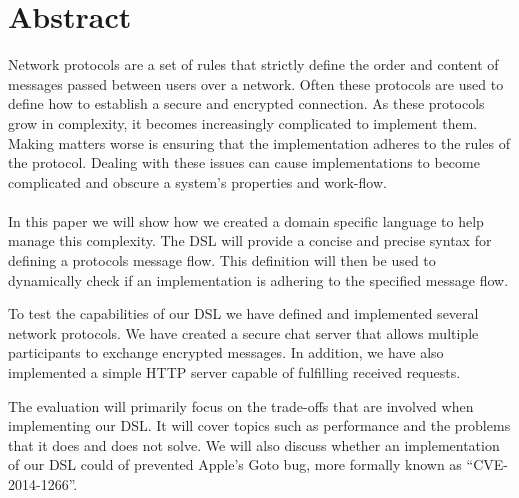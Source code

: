 \section*{Abstract}
Network protocols are a set of rules that strictly define the order and content of messages passed between users over a network. Often these protocols are used to define how to establish a secure and encrypted connection. As these protocols grow in complexity, it becomes increasingly complicated to implement them. Making matters worse is ensuring that the implementation adheres to the rules of the protocol. Dealing with these issues can cause implementations to become complicated and obscure a system's properties and work-flow.
\\\\
In this paper we will show how we created a domain specific language to help manage this complexity. The DSL will provide a concise and precise syntax for defining a protocols message flow. This definition will then be used to dynamically check if an implementation is adhering to the specified message flow. 

To test the capabilities of our DSL we have defined and implemented several network protocols. We have created a secure chat server that allows multiple participants to exchange encrypted messages. In addition, we have also implemented a simple HTTP server capable of fulfilling received requests.

The evaluation will primarily focus on the trade-offs that are involved when implementing our DSL. It will cover topics such as performance and the problems that it does and does not solve. We will also discuss whether an implementation of our DSL could of prevented Apple's Goto bug, more formally known as ``CVE-2014-1266''.
